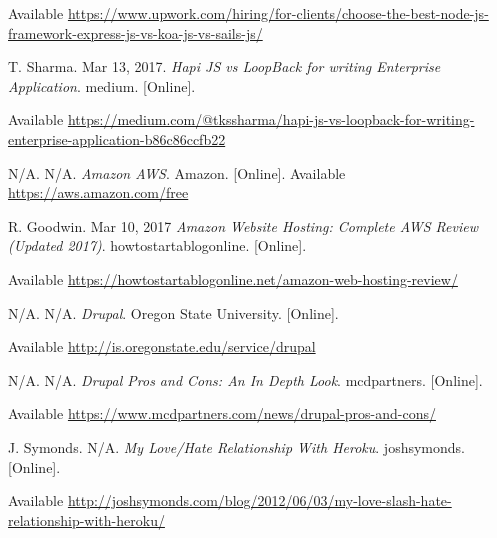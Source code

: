 Available \url{https://www.upwork.com/hiring/for-clients/choose-the-best-node-js-framework-express-js-vs-koa-js-vs-sails-js/}

\cite{hapi} T. Sharma. Mar 13, 2017. \textit{Hapi JS vs LoopBack for writing Enterprise Application}. medium. [Online]. 

Available \url{https://medium.com/@tkssharma/hapi-js-vs-loopback-for-writing-enterprise-application-b86c86ccfb22}

\cite{amazon} N/A. N/A. \textit{Amazon AWS}. Amazon. [Online]. Available \url{https://aws.amazon.com/free}

\cite{aws} R. Goodwin. Mar 10, 2017 \textit{Amazon Website Hosting: Complete AWS Review (Updated 2017)}. howtostartablogonline. [Online]. 

Available \url{https://howtostartablogonline.net/amazon-web-hosting-review/}

\cite{drupalOSU} N/A. N/A. \textit{ Drupal}. Oregon State University. [Online]. 

Available \url{http://is.oregonstate.edu/service/drupal}

\cite{drupalPC} N/A. N/A. \textit{Drupal Pros and Cons: An In Depth Look}. mcdpartners. [Online]. 

Available \url{https://www.mcdpartners.com/news/drupal-pros-and-cons/}

\cite{heroku} J. Symonds. N/A. \textit{My Love/Hate Relationship With Heroku}. joshsymonds. [Online]. 

Available \url{http://joshsymonds.com/blog/2012/06/03/my-love-slash-hate-relationship-with-heroku/}




